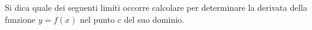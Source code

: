 Si dica quale dei seguenti limiti occorre calcolare per determinare la derivata 
della funzione $y=f(x)$ nel punto $c$ del
suo dominio.